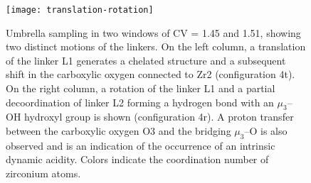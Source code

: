 \begin{figure}[!htbp]
	\centering
	\texttt{[image: translation-rotation]}
	\caption{Umbrella sampling in two windows of CV = 1.45 and 1.51, showing two distinct motions of the linkers. On the left column, a translation of the linker L1 generates a chelated structure and a subsequent shift in the carboxylic oxygen connected to Zr2 (configuration 4t). On the right column, a rotation of the linker L1 and a partial decoordination of linker L2 forming a hydrogen bond with an $\mu_3$--OH hydroxyl group is shown (configuration 4r). A proton transfer between the carboxylic oxygen O3 and the bridging $\mu_3$--O is also observed and is an indication of the occurrence of an intrinsic dynamic acidity. Colors indicate the coordination number of zirconium atoms.}
	\label{fig:translation-rotation}
\end{figure}

